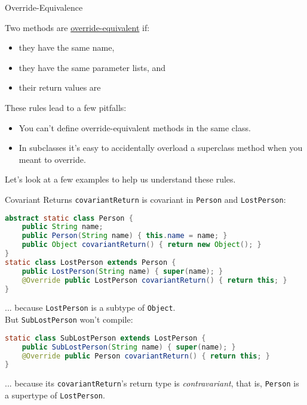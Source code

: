 \documentclass{beamer}
\begin{document}
\begin{frame}[fragile]{Override-Equivalence}

Two methods are \href{http://docs.oracle.com/javase/specs/jls/se8/html/jls-8.html#jls-8.4.2}{override-equivalent} if:
\begin{itemize}
\item they have the same name,
\item they have the same parameter lists, and
\item their return values are 
\end{itemize}

These rules lead to a few pitfalls:

\begin{itemize}
\item You can't define override-equivalent methods in the same class.
\item In subclasses it's easy to accidentally overload a superclass method when you meant to override.
\end{itemize}

Let's look at a few examples to help us understand these rules.

\end{frame}

\begin{frame}[fragile]{Covariant Returns}
\vspace{-.05in}
{\tt covariantReturn} is covariant in {\tt Person} and {\tt LostPerson}:
\vspace{-.05in}
\begin{lstlisting}[language=Java]
abstract static class Person {
    public String name;
    public Person(String name) { this.name = name; }
    public Object covariantReturn() { return new Object(); }
}
static class LostPerson extends Person {
    public LostPerson(String name) { super(name); }
    @Override public LostPerson covariantReturn() { return this; }
}
\end{lstlisting}
... because {\tt LostPerson} is a subtype of {\tt Object}.\\
But {\tt SubLostPerson} won't compile:
\vspace{-.05in}
\begin{lstlisting}[language=Java]
static class SubLostPerson extends LostPerson {
    public SubLostPerson(String name) { super(name); }
    @Override public Person covariantReturn() { return this; }
}
\end{lstlisting}
... because its {\tt covariantReturn}'s return type is {\it contravariant}, that is, {\tt Person} is a supertype of {\tt LostPerson}.
\end{frame}
\end{document}
